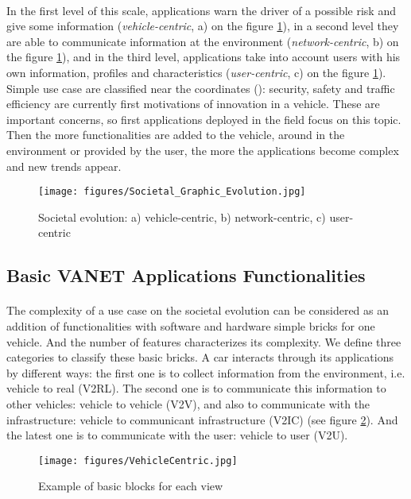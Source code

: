 \documentclass[a4paper]{article}
\begin{document}
\paragraph{}In the first level of this scale, applications warn the driver of a possible risk and give some information (\textit{vehicle-centric}, a) on the figure \ref{Function}), in a second level they are able to communicate information at the environment (\textit{network-centric}, b) on the figure \ref{Function}), and in the third level, applications take into account users with his own information, profiles and characteristics (\textit{user-centric}, c) on the figure \ref{Function}). Simple use case are classified near the coordinates (): security, safety and traffic efficiency are currently first motivations of innovation in a vehicle. These are important concerns, so first applications deployed in the field focus on this topic. Then the more functionalities are added to the vehicle, around in the environment or provided by the user, the more the applications become complex and new trends appear. 
\begin{figure}[!htb]
\begin{center}
\texttt{[image: figures/Societal\_Graphic\_Evolution.jpg]}
\caption{Societal evolution: a) vehicle-centric, b) network-centric, c) user-centric}
\label{Function}
\end{center}
\end{figure}

\subsection{Basic VANET Applications Functionalities}

\paragraph{}The complexity of a use case on the societal evolution can be considered as an addition of functionalities with software and hardware simple bricks for one vehicle. And the number of features characterizes its complexity. We define three categories to classify these basic bricks. A car interacts through its applications by different ways: the first one is to collect information from the environment, i.e. vehicle to real (V2RL). The second one is to communicate this information to other vehicles: vehicle to vehicle (V2V), and also to communicate with the infrastructure: vehicle to communicant infrastructure (V2IC) (see figure \ref{VehicleCentric}). And the latest one is to communicate with the user: vehicle to user (V2U).
\begin{figure}[!htb]
\begin{center}
\texttt{[image: figures/VehicleCentric.jpg]}
\caption{Example of basic blocks for each view}
\label{VehicleCentric}
\end{center}
\end{figure}
\end{document}
